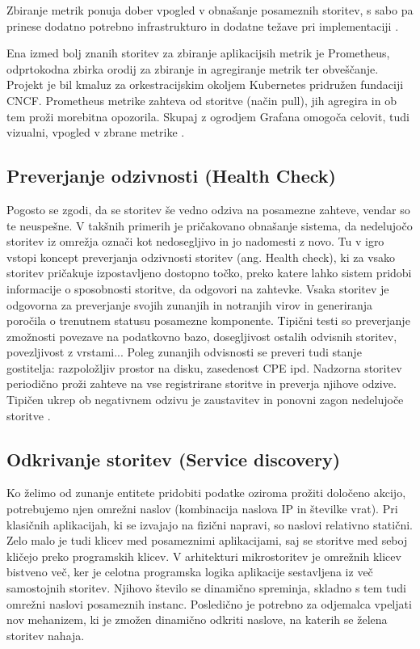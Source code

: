 \documentclass[a4paper, 12pt]{book}
\begin{document}
Zbiranje metrik ponuja dober vpogled v obnašanje posameznih storitev, s sabo pa prinese dodatno potrebno infrastrukturo in dodatne težave pri implementaciji \cite{ApplicationMetrics}.


Ena izmed bolj znanih storitev za zbiranje aplikacijsih metrik je Prometheus, odprtokodna zbirka orodij za zbiranje in agregiranje metrik ter obveščanje.
Projekt je bil kmaluz za orkestracijskim okoljem Kubernetes pridružen fundaciji CNCF.
Prometheus metrike zahteva od storitve (način pull), jih agregira in ob tem proži morebitna opozorila.
Skupaj z ogrodjem Grafana omogoča celovit, tudi vizualni, vpogled v zbrane metrike \cite{Prometheus}.

\subsection{Preverjanje odzivnosti (Health Check)}

Pogosto se zgodi, da se storitev še vedno odziva na posamezne zahteve, vendar so te neuspešne.
V takšnih primerih je pričakovano obnašanje sistema, da nedelujočo storitev iz omrežja označi kot nedosegljivo in jo nadomesti z novo.
Tu v igro vstopi koncept preverjanja odzivnosti storitev (ang. Health check), ki za vsako storitev pričakuje izpostavljeno dostopno točko, preko katere lahko sistem pridobi informacije o sposobnosti storitve, da odgovori na zahtevke.
Vsaka storitev je odgovorna za preverjanje svojih zunanjih in notranjih virov in generiranja poročila o trenutnem statusu posamezne komponente.
Tipični testi so preverjanje zmožnosti povezave na podatkovno bazo, dosegljivost ostalih odvisnih storitev, povezljivost z vrstami...
Poleg zunanjih odvisnosti se preveri tudi stanje gostitelja: razpoložljiv prostor na disku, zasedenost CPE ipd.
Nadzorna storitev periodično proži zahteve na vse registrirane storitve in preverja njihove odzive.
Tipičen ukrep ob negativnem odzivu je zaustavitev in ponovni zagon nedelujoče storitve \cite{healthCheck}.

\subsection{Odkrivanje storitev (Service discovery)}

Ko želimo od zunanje entitete pridobiti podatke oziroma prožiti določeno akcijo, potrebujemo njen omrežni naslov (kombinacija naslova IP in številke vrat).
Pri klasičnih aplikacijah, ki se izvajajo na fizični napravi, so naslovi relativno statični.
Zelo malo je tudi klicev med posameznimi aplikacijami, saj se storitve med seboj kličejo preko programskih klicev.
V arhitekturi mikrostoritev je omrežnih klicev bistveno več, ker je celotna programska logika aplikacije sestavljena iz več samostojnih storitev.
Njihovo število se dinamično spreminja, skladno s tem tudi omrežni naslovi posameznih instanc.
Posledično je potrebno za odjemalca vpeljati nov mehanizem, ki je zmožen dinamično odkriti naslove, na katerih se želena storitev nahaja.
\end{document}
